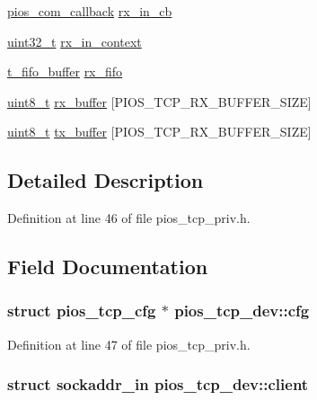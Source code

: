 \begin{DoxyCompactItemize}
\hyperlink{group___p_i_o_s___c_o_m_ga23f1888821f1f74a50c02adc459df597}{pios\-\_\-com\-\_\-callback} \hyperlink{structpios__tcp__dev_a0e3c94ab5a2e01eb6a1e09338346daa3}{rx\-\_\-in\-\_\-cb}
\item 
\hyperlink{stdint_8h_a435d1572bf3f880d55459d9805097f62}{uint32\-\_\-t} \hyperlink{structpios__tcp__dev_a55e947335052394bec5578cf78c4a089}{rx\-\_\-in\-\_\-context}
\item 
\hyperlink{structt__fifo__buffer}{t\-\_\-fifo\-\_\-buffer} \hyperlink{structpios__tcp__dev_a48ebec48fa9790acf34536e86954760e}{rx\-\_\-fifo}
\item 
\hyperlink{stdint_8h_aba7bc1797add20fe3efdf37ced1182c5}{uint8\-\_\-t} \hyperlink{structpios__tcp__dev_ae514c540c1d91177a04c4e6042136a0e}{rx\-\_\-buffer} \mbox{[}P\-I\-O\-S\-\_\-\-T\-C\-P\-\_\-\-R\-X\-\_\-\-B\-U\-F\-F\-E\-R\-\_\-\-S\-I\-Z\-E\mbox{]}
\item 
\hyperlink{stdint_8h_aba7bc1797add20fe3efdf37ced1182c5}{uint8\-\_\-t} \hyperlink{structpios__tcp__dev_a58bf5c1b8a6d9ef9d7ffc739387f0069}{tx\-\_\-buffer} \mbox{[}P\-I\-O\-S\-\_\-\-T\-C\-P\-\_\-\-R\-X\-\_\-\-B\-U\-F\-F\-E\-R\-\_\-\-S\-I\-Z\-E\mbox{]}
\end{DoxyCompactItemize}


\subsection{Detailed Description}


Definition at line 46 of file pios\-\_\-tcp\-\_\-priv.\-h.



\subsection{Field Documentation}
\hypertarget{structpios__tcp__dev_a8afddb370dbdf2eccb0810cc0ffe09fd}{
\subsubsection[{cfg}]{\setlength{\rightskip}{0pt plus 5cm}struct {\bf pios\-\_\-tcp\-\_\-cfg} $\ast$ pios\-\_\-tcp\-\_\-dev\-::cfg}}\label{structpios__tcp__dev_a8afddb370dbdf2eccb0810cc0ffe09fd}


Definition at line 47 of file pios\-\_\-tcp\-\_\-priv.\-h.

\hypertarget{structpios__tcp__dev_a12cf1402bddf7d9f4b704a1222010977}{
\subsubsection[{client}]{\setlength{\rightskip}{0pt plus 5cm}struct sockaddr\-\_\-in pios\-\_\-tcp\-\_\-dev\-::client}}\label{structpios__tcp__dev_a12cf1402bddf7d9f4b704a1222010977}


